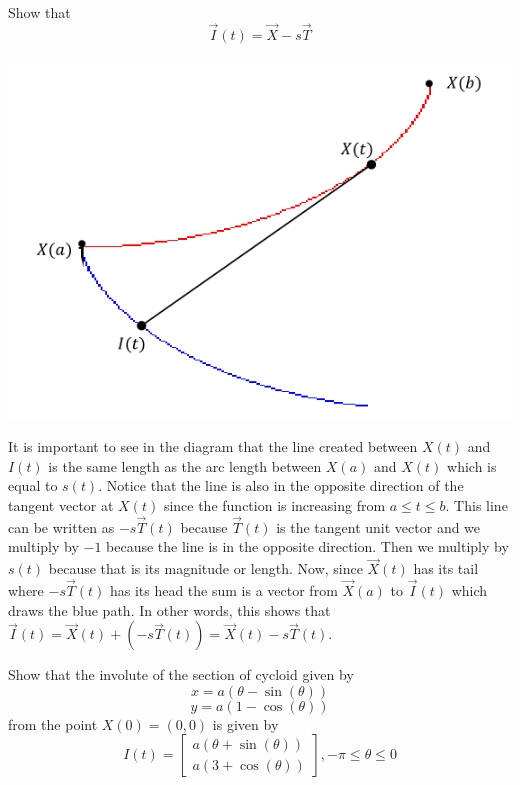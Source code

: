 \documentclass[titlepage]{article}
\begin{document}
\fancyhf{}
\cfoot{\thepage}

\begin{problem}{1}
Show that
$$ \vec{I}(t) = \vec{X} - s\vec{T}$$
\end{problem}
\includegraphics[scale=.5]{curves.png}
\begin{solution}
It is important to see in the diagram that the line created between ${X}(t)$ and ${I}(t)$ is the same length as the arc length between ${X}(a)$ and ${X}(t)$ which is equal to $s(t)$. Notice that the line is also in the opposite direction of the tangent vector at ${X}(t)$ since the function is increasing from $a\leq t\leq b$. This line can be written as $-s\vec{T}(t)$ because $\vec{T}(t)$ is the tangent unit vector and we multiply by $-1$ because the line is in the opposite direction. Then we multiply by $s(t)$ because that is its magnitude or length. Now, since $\vec{X}(t)$ has its tail where $-s\vec{T}(t)$ has its head the sum is a vector from $\vec{X}(a)$ to $\vec{I}(t)$ which draws the blue path. In other words, this shows that $\vec{I}(t) = \vec{X}(t)+ (-s\vec{T}(t)) = \vec{X}(t) -s\vec{T}(t)$.
\end{solution}

\begin{problem}{2}
Show that the involute of the section of cycloid given by
$$x = a(\theta - \sin(\theta))$$
$$y = a(1 - \cos(\theta))$$
from the point $X(0) = (0,0)$ is given by
$$ I(t) = \begin{bmatrix}a(\theta + \sin(\theta)) \\ a(3 + \cos(\theta)) \end{bmatrix}, -\pi \leq \theta \leq 0$$
\end{problem}
\end{document}

